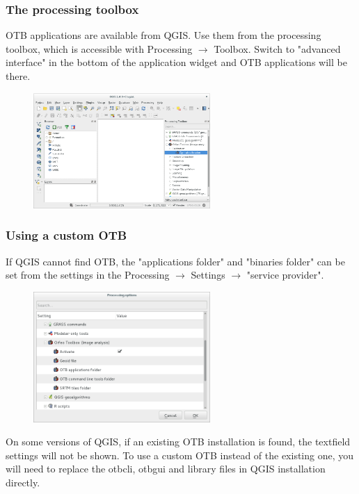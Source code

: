 \subsubsection{The processing toolbox}
OTB applications are available from QGIS. Use them from the processing toolbox,
which is accessible with Processing $\rightarrow$ Toolbox. Switch to "advanced interface"
in the bottom of the application widget and OTB applications will be there.

\begin{figure}[h]
  \center
  \includegraphics[width=0.6\textwidth]{../Art/QtImages/qgis-otb.png}
  \label{fig:otb-qgis}
\end{figure}

\subsubsection{Using a custom OTB}
If QGIS cannot find OTB, the "applications folder" and "binaries folder" can be
set from the settings in the Processing $\rightarrow$ Settings $\rightarrow$ "service provider".

\begin{figure}[h]
  \center
  \includegraphics[width=0.6\textwidth]{../Art/QtImages/qgis-otb-settings.png}
  \label{fig:otb-qgis-settings}
\end{figure}

On some versions of QGIS, if an existing OTB installation is found, the
textfield settings will not be shown. To use a custom OTB instead of the
existing one, you will need to replace the otbcli,
otbgui and library files in QGIS installation directly.
